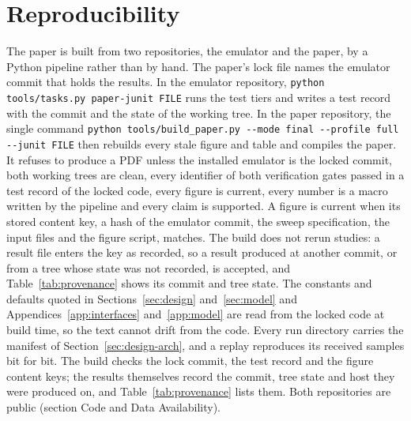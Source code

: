 \section{Reproducibility}\label{app:repro}

The paper is built from two repositories, the emulator and the paper, by a
Python pipeline rather than by hand. The paper's lock file names the emulator commit that
holds the results. In the
emulator repository, \texttt{python tools/tasks.py paper-junit FILE} runs the test tiers and
writes a test record with the commit and the state of the working tree. In the paper
repository, the single command
\texttt{python tools/build\_paper.py -{}-mode final -{}-profile full -{}-junit FILE} then rebuilds
every stale figure and table and compiles the paper. It refuses to produce a PDF unless the
installed emulator is the locked commit, both working trees are clean, every identifier of
both verification gates passed in a test record of the locked code, every figure is current,
every number is a macro written by the pipeline and every claim is supported. A figure is
current when its stored content key, a hash of the emulator commit, the sweep specification,
the input files and the figure script, matches. The build does not rerun studies: a result
file enters the key as recorded, so a result produced at another commit, or from a tree whose
state was not recorded, is accepted, and Table~\ref{tab:provenance} shows its commit and
tree state. The constants and defaults quoted in
Sections~\ref{sec:design} and~\ref{sec:model} and Appendices~\ref{app:interfaces}
and~\ref{app:model} are read from the locked code at build time,
so the text cannot drift from the code. Every run directory carries the manifest of
Section~\ref{sec:design-arch}, and a replay reproduces its received samples bit for bit. The
build checks the lock commit, the test record and the figure content keys; the results
themselves record the commit, tree state and host they were produced on, and
Table~\ref{tab:provenance} lists them. Both repositories are public (section Code and Data
Availability).

